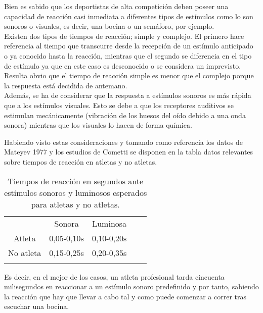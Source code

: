 \iffalse
Bien es sabido que los deportistas de alta competición deben poseer una capacidad de reacción casi inmediata a diferentes tipos de estímulos como lo son sonoros o visuales, es decir, una bocina o un semáforo, por ejemplo. 
\\
Existen dos tipos de tiempos de reacción\cite{tiempo_reaccion}; simple y complejo. El primero hace referencia al tiempo que transcurre desde la recepción de un estímulo anticipado o ya conocido hasta la reacción, mientras que el segundo se diferencia en el tipo de estímulo ya que en este caso es desconocido o se considera un imprevisto. Resulta obvio que el tiempo de reacción simple es menor que el complejo porque la respuesta está decidida de antemano. 
\\
Además, se ha de considerar que la respuesta a estímulos sonoros es más rápida que a los estímulos visuales. Esto se debe a que los receptores auditivos se estimulan mecánicamente (vibración de los huesos del oído debido a una onda sonora) mientras que los visuales lo hacen de forma química.

Habiendo visto estas consideraciones y tomando como referencia los datos de Mateyev 1977 y los estudios de Cometti se disponen en la tabla  datos relevantes sobre tiempos de reacción en atletas y no atletas.
 
\begin{table}[]
\centering
\begin{tabular}{cccll}
\cline{2-3}
\multicolumn{1}{c|}{}           & \multicolumn{1}{c|}{Sonora}    & \multicolumn{1}{c|}{Luminosa}  &  &  \\ \cline{1-3}
\multicolumn{1}{|c|}{Atleta}    & \multicolumn{1}{c|}{0,05-0,10s} & \multicolumn{1}{c|}{0,10-0,20s} &  &  \\ \cline{1-3}
\multicolumn{1}{|c|}{No atleta} & \multicolumn{1}{c|}{0,15-0,25s} & \multicolumn{1}{c|}{0,20-0,35s} &  &  \\ \cline{1-3}
\multicolumn{1}{l}{}            & \multicolumn{1}{l}{}           & \multicolumn{1}{l}{}           &  & 
\end{tabular}
\caption{Tiempos de reacción en segundos ante estímulos sonoros y luminosos esperados para atletas y no atletas.}
\end{table}

Es decir, en el mejor de los casos, un atleta profesional tarda cincuenta milisegundos en reaccionar a un estímulo sonoro predefinido y por tanto, sabiendo la reacción que hay que llevar a cabo tal y como puede comenzar a correr tras escuchar una bocina.

